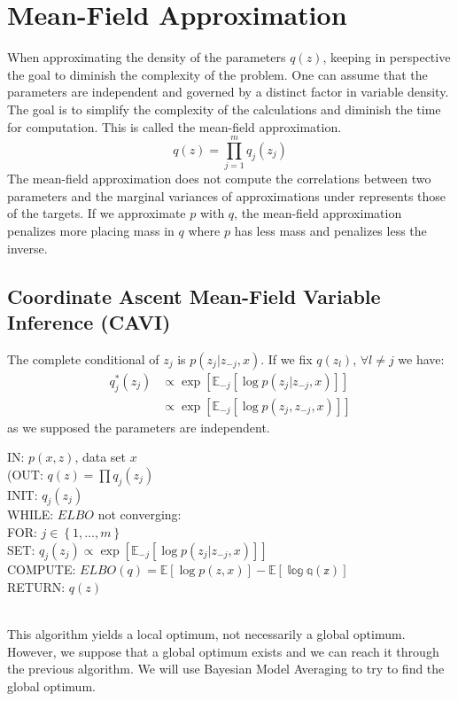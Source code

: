 \section{Mean-Field Approximation}
When approximating the density of the parameters $q(z)$, keeping in perspective the goal to diminish the complexity of the problem. One can assume that the parameters are independent and governed by a distinct factor in variable density. The goal is to simplify the complexity of the calculations and diminish the time for computation. This is called the mean-field approximation.
\begin{equation}
q(z) = \prod_{j=1}^m q_j(z_j)
\label{eq:meanField}
\end{equation}
The mean-field approximation does not compute the correlations between two parameters and the marginal variances of approximations under represents those of the targets. If we approximate $p$ with $q$, the mean-field approximation penalizes more placing mass in $q$ where $p$ has less mass and penalizes less the inverse.

\subsection{Coordinate Ascent Mean-Field Variable Inference (CAVI)}
The complete conditional of $z_j$ is $p(z_j|z_{-j},x)$. If we fix $q(z_l)$, $\forall l \neq j$ we have:
\begin{align}
q^*_j(z_j) &\propto \exp\left[\mathbb{E}_{-j}\left[\log p(z_j|z_{-j},x)\right]\right]\\
&\propto \exp\left[\mathbb{E}_{-j}\left[\log p(z_j,z_{-j},x)\right]\right]
\label{eq:CAVI}
\end{align}
as we supposed the parameters are independent.\\
\newline

\begin{text}
IN: $p(x,z)$, data set $x$\\
(OUT: $q(z) = \prod q_j(z_j)$\\
INIT: $q_j(z_j)$\\
WHILE: $ELBO$ not converging:\\
	FOR: $j \in \left\lbrace1, \dots, m\right\rbrace$\\
		SET: $q_j(z_j) \propto \exp\left[\mathbb{E}_{-j}\left[\log p(z_j|z_{-j},x)\right]\right]$\\
	COMPUTE: $ELBO(q) = \mathbb{E}\left[\log p(z,x)\right] - \mathbb{E\left[\log q(z)\right]}$\\
RETURN: $q(z)$
\end{text}
\\
\newline
This algorithm yields a local optimum, not necessarily a global optimum. However, we suppose that a global optimum exists and we can reach it through the previous algorithm. We will use Bayesian Model Averaging to try to find the global optimum.